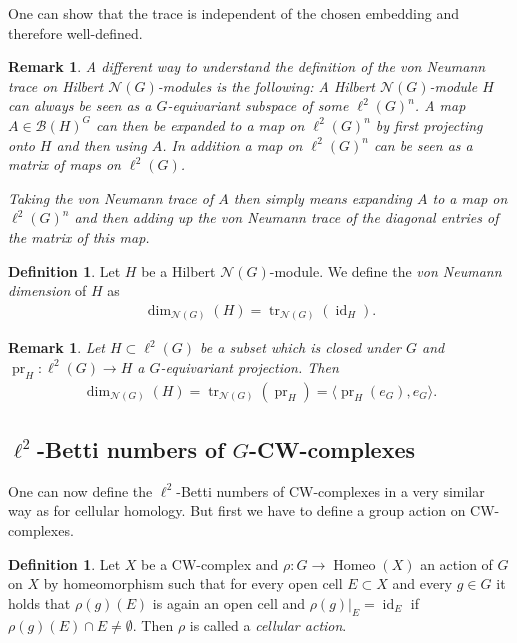 \documentclass[12pt,a4paper]{scrartcl}
\theoremstyle{plain}
\newtheorem{Remark}[Theorem]{Remark}
\theoremstyle{definition}
\newtheorem{Definition}[Theorem]{Definition}
\newcommand{\2}{\mathbb{Z} / 2 \mathbb{Z}}
\newcommand{\1}{\bar{1}}
\newcommand{\0}{\bar{0}}
\newcommand{\tr}{\operatorname{tr}}
\newcommand{\pr}{\operatorname{pr}}
\newcommand{\Homeo}{\operatorname{Homeo}}
\newcommand{\id}{\operatorname{id}}
\begin{document}
One can show that the trace is independent of the chosen embedding and therefore well-defined.
\begin{Remark}
	A different way to understand the definition of the von Neumann trace on Hilbert $\mathcal{N}(G)$-modules is the following:
	A Hilbert $\mathcal{N}(G)$-module $H$ can always be seen as a $G$-equivariant subspace of some $\ell^2(G)^n$. A map $A \in \mathcal{B}(H)^G$ can then be expanded to a map on $\ell^2(G)^n$ by first projecting onto $H$ and then using $A$. In addition a map on $\ell^2(G)^n$ can be seen as a matrix of maps on $\ell^2(G)$.
	
	Taking the von Neumann trace of $A$ then simply means expanding $A$ to a map on $\ell^2(G)^n$ and then adding up the von Neumann trace of the diagonal entries of the matrix of this map.
\end{Remark}
\begin{Definition}\label{vNd}
	Let $H$ be a Hilbert $\mathcal{N}(G)$-module. We define the \emph{von Neumann dimension} of $H$ as
	\begin{align*}
		\dim_{\mathcal{N}(G)}(H) = \tr_{\mathcal{N}(G)}(\id_H).
	\end{align*}
\end{Definition}
\begin{Remark}\label{vNd_for_subsets}
	Let $H \subset \ell^2(G)$ be a subset which is closed under $G$ and $\pr_H\colon\ell^2(G) \to H$ a $G$-equivariant projection. Then
	\begin{align*}
	\dim_{\mathcal{N}(G)}(H) = \tr_{\mathcal{N}(G)}(\pr_H) = \langle \pr_H (e_G), e_G \rangle.
	\end{align*}
\end{Remark}

\subsection{$\ell^2$-Betti numbers of $G$-CW-complexes}
One can now define the $\ell^2$-Betti numbers of CW-complexes in a very similar way as for cellular homology. But first we have to define a group action on CW-complexes.
\begin{Definition}
	Let $X$ be a CW-complex and $\rho\colon G \to \Homeo(X)$ an action of $G$ on $X$ by homeomorphism such that for every open cell $E \subset X$ and every $g \in G$ it holds that $\rho(g)(E)$ is again an open cell and $\rho(g)|_{E} = \id_E$ if $\rho(g)(E) \cap E \neq \emptyset$. Then $\rho$ is called a \emph{cellular action}.
\end{Definition}
\end{document}
